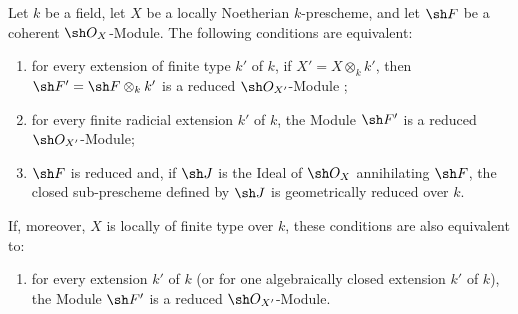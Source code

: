 \begin{proposition}[4.6.16]
\label{IV.4.6.16}
Let $k$ be a field, let $X$ be a locally Noetherian $k$-prescheme,
and let $\sh F$ be a coherent $\sh O_X$-Module.
The following conditions are equivalent:
\begin{enumerate}
\item[\rm(a)]
\label{IV.4.6.16.a}
for every extension of finite type $k'$ of $k$, if
$X'=X\otimes_k k'$, then
$\sh F'=\sh F\otimes_k k'$ is a reduced
$\sh O_{X'}$-Module ;

\item[\rm(b)]
\label{IV.4.6.16.b}
for every finite radicial extension $k'$ of $k$, the Module $\sh F'$
is a reduced $\sh O_{X'}$-Module;

\item[\rm(c)]
\label{IV.4.6.16.c}
$\sh F$ is reduced and, if $\sh J$ is the Ideal of $\sh O_X$
annihilating $\sh F$, the closed sub-prescheme defined by $\sh J$ is
geometrically reduced over $k$.
\end{enumerate}
If, moreover, $X$ is locally of finite type over $k$, these conditions
are also equivalent to:
\begin{enumerate}
\item[\rm(d)]
\label{IV.4.6.16.d}
for every extension $k'$ of $k$
(or for one algebraically closed extension $k'$ of $k$), the Module
$\sh F'$ is a reduced $\sh O_{X'}$-Module.
\end{enumerate}
\end{proposition}

